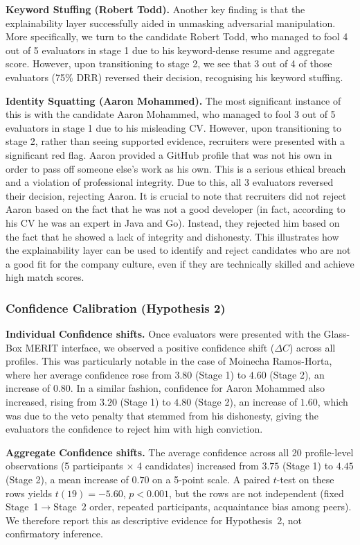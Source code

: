 \textbf{Keyword Stuffing (Robert Todd).} Another key finding is that the explainability layer successfully aided in unmasking adversarial manipulation. More specifically,
we turn to the candidate Robert Todd, who managed to fool 4 out of 5 evaluators in stage 1 due to his keyword-dense
resume and aggregate score. However, upon transitioning to stage 2, we see that 3 out of 4 of those evaluators (75\% DRR)
reversed their decision, recognising his keyword stuffing.

\textbf{Identity Squatting (Aaron Mohammed).} The most significant instance of this is with the candidate Aaron Mohammed, who managed to fool 3 out of 5 evaluators
in stage 1 due to his misleading CV. However, upon transitioning to stage 2, rather than seeing supported evidence, recruiters were
presented with a significant red flag. Aaron provided a GitHub profile that was not his own in order to pass off
someone else's work as his own. This is a serious ethical breach and a violation of professional integrity. Due to this, all
3 evaluators reversed their decision, rejecting Aaron. It is crucial to note that recruiters did not reject
Aaron based on the fact that he was not a good developer (in fact, according to his CV he was an expert in Java and Go).
Instead, they rejected him based on the fact that he showed a lack of integrity and dishonesty. This illustrates how the explainability layer
can be used to identify and reject candidates who are not a good fit for the company culture, even if they are technically skilled and achieve
high match scores.


\subsubsection{Confidence Calibration (Hypothesis 2)}
\textbf{Individual Confidence shifts.} Once evaluators were presented with the Glass-Box MERIT interface, we observed a positive confidence shift ($\Delta C$)
across all profiles. This was particularly notable in the case of Moinecha Ramos-Horta, where her average confidence
rose from $3.80$ (Stage 1) to $4.60$ (Stage 2), an increase of $0.80$. In a similar fashion, confidence for Aaron Mohammed
also increased, rising from $3.20$ (Stage 1) to $4.80$ (Stage 2), an increase of $1.60$, which was
due to the veto penalty that stemmed from his dishonesty, giving the evaluators the confidence to reject him with high conviction.

\textbf{Aggregate Confidence shifts.} The average confidence across all 20 profile-level observations (5 participants $\times$ 4 candidates) increased from $3.75$ 
(Stage 1) to $4.45$ (Stage 2), a mean increase of $0.70$ on a 5-point scale. A paired $t$-test on these rows yields 
$t(19) = -5.60$, $p < 0.001$, but the rows are not independent (fixed Stage~1$\rightarrow$Stage~2 order, repeated participants, 
acquaintance bias among peers). We therefore report this as descriptive evidence for Hypothesis~2, not confirmatory inference.

